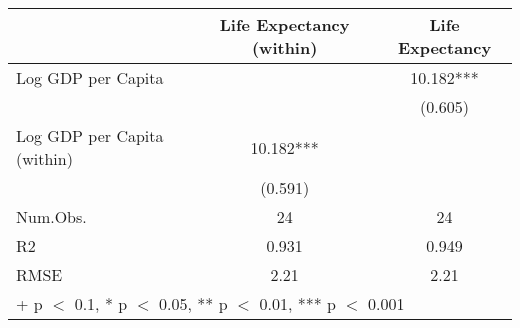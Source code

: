 \begin{table}
\centering
\begin{tabular}[t]{lcc}
\toprule
  & Life Expectancy (within) & Life Expectancy\\
\midrule
Log GDP per Capita &  & \num{10.182}***\\
 &  & (\num{0.605})\\
Log GDP per Capita (within) & \num{10.182}*** & \\
 & (\num{0.591}) & \\
\midrule
Num.Obs. & \num{24} & \num{24}\\
R2 & \num{0.931} & \num{0.949}\\
RMSE & \num{2.21} & \num{2.21}\\
\bottomrule
\multicolumn{3}{l}{\rule{0pt}{1em}+ p $<$ 0.1, * p $<$ 0.05, ** p $<$ 0.01, *** p $<$ 0.001}\\
\end{tabular}
\end{table}
